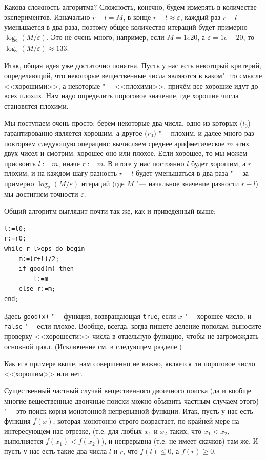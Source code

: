 \documentclass[a4paper,10pt]{problems}
\let\eps\varepsilon
\begin{document}
Какова сложность алгоритма? Сложность, конечно, будем измерять в количестве экспериментов.
Изначально $r-l=M$, в конце $r-l\approx \eps$, каждый раз $r-l$ уменьшается в два раза,
поэтому общее количество итераций будет примерно $\log_2 (M/\eps)$. 
Это не очень много; например, если $M=1e20$, а $\eps=1e-20$, то $\log_2 (M/\eps)\approx 133$.

Итак, общая идея уже достаточно понятна. 
Пусть у нас есть некоторый критерий, определяющий, что некоторые вещественные числа являются в каком"=то смысле <<хорошими>>, а некоторые "--- <<плохими>>,
причём все хорошие идут до всех плохих. 
Нам надо определить пороговое значение, где хорошие числа становятся плохими.

Мы поступаем очень просто: берём некоторые два числа, одно из которых ($l_0$) гарантированно является хорошим, а другое ($r_0$) "--- плохим,
и далее много раз повторяем следующую операцию: вычисляем среднее арифметическое $m$ этих двух чисел и смотрим: хорошее оно или плохое.
Если хорошее, то мы можем присвоить $l:=m$, иначе $r:=m$. 
В итоге у нас постоянно $l$ будет хорошим, а $r$ плохим, и на каждом шагу разность $r-l$ будет уменьшаться в два раза 
"--- за примерно $\log_2(M/\eps)$ итераций (где $M$ "--- начальное значение разности $r-l$) мы достигнем точности $\eps$.

Общий алгоритм выглядит почти так же, как и приведённый выше:
\begin{codesampleo}\begin{verbatim}
l:=l0;
r:=r0;
while r-l>eps do begin    
    m:=(r+l)/2;
    if good(m) then
        l:=m
    else r:=m;
end;
\end{verbatim}
\end{codesampleo}

Здесь \verb`good(x)` "--- функция, возвращающая \verb`true`, если $x$ "--- хорошее число, и \verb`false` "--- если плохое. 
Вообще, всегда, когда пишете деление пополам, выносите проверку <<хорошести>> числа в отдельную функцию, чтобы не загромождать основной цикл.
(Исключение см. в следующем разделе.)

Как и в примере выше, нам совершенно не важно, является ли пороговое число <<хорошим>> или нет.

Существенный частный случай вещественного двоичного поиска (да и вообще многие вещественные двоичные поиски можно объявить частным случаем этого)
"--- это поиск корня монотонной непрерывной функции.
Итак, пусть у нас есть функция $f(x)$, которая монотонно строго возрастает, по крайней мере на интересующем нас отрезке, (т.е. для любых $x_1$ и $x_2$ таких, что $x_1<x_2$, выполняется $f(x_1)<f(x_2)$),
и непрерывна (т.е. не имеет скачков) там же.
И пусть у нас есть такие два числа $l$ и $r$, что $f(l)\leq0$, а $f(r)\geq0$.
\end{document}
